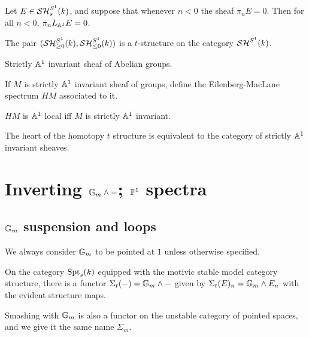 \documentclass{amsart}%
\begin{document}
\begin{theorem}
  Let $E \in \mathcal{SH}_s^{S^1}(k)$, and suppose that whenever $n < 0$ the
  sheaf $\pi_n E = 0$. Then for all $n<0$, $\pi_n L_{\mathbb{A}^1}E = 0$.
\end{theorem}

\begin{theorem}
  The pair $(\mathcal{SH}_{\geq 0}^{S^1}(k), \mathcal{SH}_{\leq 0}^{S^1}(k))$ is a
  $t$-structure on the category $\mathcal{SH}^{S^1}(k)$. 
\end{theorem}

\begin{definition}
  Strictly $\mathbb{A}^1$ invariant sheaf of Abelian groups.

  If $M$ is strictly $\mathbb{A}^1$ invariant sheaf of groups, define the
  Eilenberg-MacLane spectrum $HM$ associated to it. 
\end{definition}

\begin{proposition}
  $HM$ is $\mathbb{A}^1$ local iff $M$ is strictly $\mathbb{A}^1$ invariant.
\end{proposition}

\begin{proposition}
  The heart of the homotopy $t$ structure is equivalent to the
  category of strictly $\mathbb{A}^1$ invariant sheaves. 
\end{proposition}

\section{Inverting $\mathbb{G}_m\wedge -$; $\mathbb{P}^1$ spectra}

\subsection{$\mathbb{G}_m$ suspension and loops}

We always consider $\mathbb{G}_m$ to be pointed at $1$ unless otherwise
specified.

\begin{definition}
On the category $\mathrm{Spt}_s(k)$ equipped with the motivic stable model
category structure, there is a functor $\Sigma_t(-) = \mathbb{G}_m \wedge -$
given by $\Sigma_t(E)_n = \mathbb{G}_m \wedge E_n$ with the evident
structure maps.

Smashing with $\mathbb{G}_m$ is also a functor on the unstable category of
pointed spaces, and we give it the same name $\Sigma_m$.
\end{definition}
\end{document}
